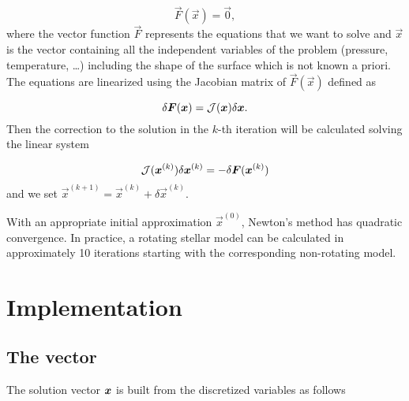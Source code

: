 \begin{equation}
\vec F(\vec x)=\vec 0 ,
\end{equation}
where the vector function $\vec F$ represents the equations that we
want to solve and $\vec x$ is the vector containing all the independent
variables of the problem (pressure, temperature, \ldots) including the
shape of the surface which is not known a priori.  The equations are
linearized using the Jacobian matrix of $\vec F(\vec x)$ defined as

\begin{equation}
\delta\vec F(\vec x)=\tens J (\vec x) \delta\vec x .
\end{equation}
Then the correction to the solution in the $k$-th iteration will be
calculated solving the linear system

\begin{equation}
\tens J(\vec x^{(k)})\delta \vec x^{(k)}=-\delta \vec F(\vec x^{(k)})
\end{equation}
and we set $\vec x^{(k+1)}=\vec x^{(k)}+\delta \vec x^{(k)}$.

With an appropriate initial approximation $\vec x^{(0)}$, Newton's method
has quadratic convergence. In practice, a rotating stellar model can be
calculated in approximately 10 iterations starting with the corresponding
non-rotating model.

\section{Implementation}

\subsection{The vector}

The solution vector $\vx$ is built from the discretized variables as
follows

